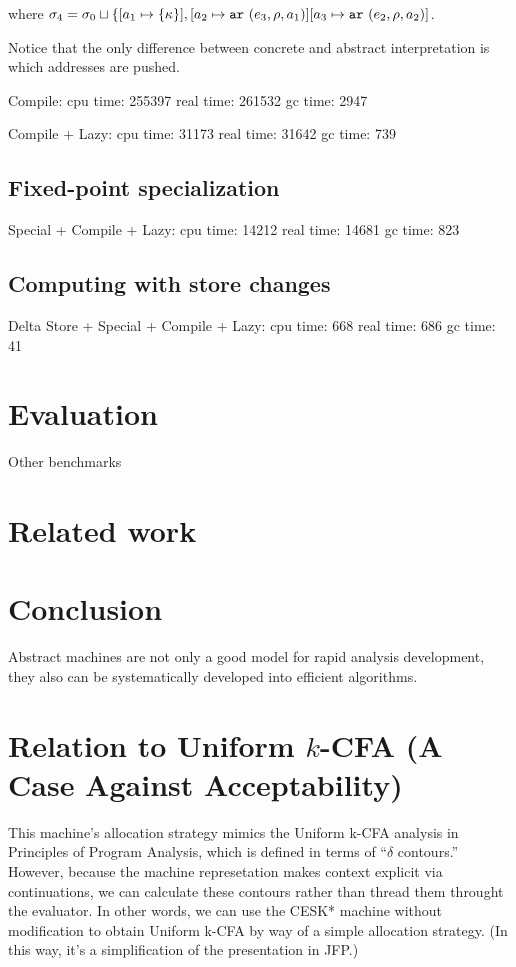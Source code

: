 \documentclass{llncs}
\begin{document}
where $\sigma_4 = \sigma_0 \sqcup \{ [a_1 \mapsto \{ \kappa \}],
[a_2 \mapsto {\tt ar\ }({e_3,\rho,a_1})]
[a_3 \mapsto {\tt ar\ }({e_2,\rho,a_2})]$.


Notice that the only difference between concrete and abstract interpretation
is which addresses are pushed.


Compile:
   cpu time: 255397 real time: 261532 gc time: 2947

\noindent
Compile + Lazy:
   cpu time: 31173 real time: 31642 gc time: 739

\subsection{Fixed-point specialization}


Special + Compile + Lazy:
   cpu time: 14212 real time: 14681 gc time: 823

\subsection{Computing with store changes}

Delta Store + Special + Compile + Lazy:
   cpu time: 668 real time: 686 gc time: 41

\section{Evaluation}

Other benchmarks

\section{Related work}

\section{Conclusion}

Abstract machines are not only a good model for rapid analysis
development, they also can be systematically developed into efficient
algorithms.

\appendix
\section{Relation to Uniform \(k\)-CFA (A Case Against Acceptability)}

This machine's allocation strategy mimics the Uniform k-CFA analysis
in Principles of Program Analysis, which is defined in terms of
``$\delta$ contours.''  However, because the machine represetation makes
context explicit via continuations, we can calculate these contours
rather than thread them throught the evaluator.  In other words, we
can use the CESK* machine without modification to obtain Uniform k-CFA
by way of a simple allocation strategy.  (In this way, it's a
simplification of the presentation in JFP.)
\end{document}
